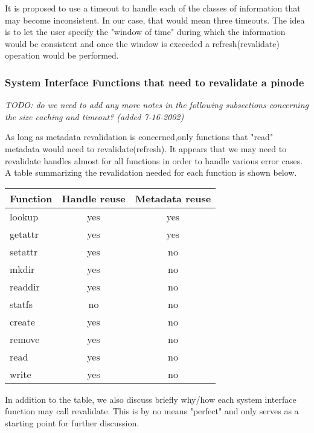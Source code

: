 \documentclass[11pt, letterpaper]{article}
\begin{document}
It is proposed to use a timeout to handle each of the classes of
information that may become inconsistent. In our case, that would mean
three timeouts. The idea is to let the user specify the "window of time"
during which the information would be consistent and once the window
is exceeded a refresh(revalidate) operation would be performed.

\subsubsection{System Interface Functions that need to revalidate a pinode}

\emph{TODO: do we need to add any more notes in the following
subsections concerning the size caching and timeout? (added
7-16-2002)}

As long as metadata revalidation is concerned,only functions that "read"
metadata would need to revalidate(refresh). It appears that we may need 
to revalidate handles almost for all functions in order to handle various
error cases. A table summarizing the revalidation needed for each function
is shown below.\\ 

\begin{table}
\begin{tabular}{|l|c|c|}
\hline
Function & Handle reuse & Metadata reuse \\
\hline
\hline
lookup & yes & yes \\
getattr & yes & yes \\           
setattr & yes &  no \\ 
mkdir & yes & no \\         
readdir & yes & no \\
statfs & no & no \\
create & yes & no \\
remove & yes & no \\
read & yes & no \\
write & yes & no \\ 
\hline
\end{tabular}
\end{table}

In addition to the table, we also discuss briefly why/how each system interface
function may call revalidate. This is by no means "perfect" and only serves
as a starting point for further discussion.
\end{document}
